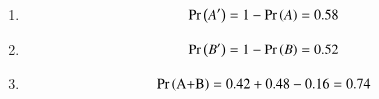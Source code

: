 \solution
\begin{enumerate}
\item 
\begin{align}
\Pr\left(A^{\prime}\right) = 1 - \Pr\left(A\right) 
= 0.58 
\end{align}
%
\item 
\begin{align}
\Pr\left(B^{\prime}\right) = 1 - \Pr\left(B\right) 
= 0.52
\end{align}
%
\item 
\begin{align}
\Pr\left(\text{A+B}\right)  
= 0.42 + 0.48 - 0.16 
= 0.74
\end{align}
\end{enumerate}
